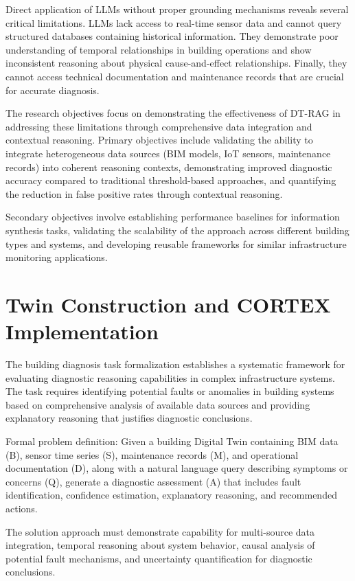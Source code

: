 Direct application of LLMs without proper grounding mechanisms reveals several critical limitations. LLMs lack access to real-time sensor data and cannot query structured databases containing historical information. They demonstrate poor understanding of temporal relationships in building operations and show inconsistent reasoning about physical cause-and-effect relationships. Finally, they cannot access technical documentation and maintenance records that are crucial for accurate diagnosis.

The research objectives focus on demonstrating the effectiveness of DT-RAG in addressing these limitations through comprehensive data integration and contextual reasoning. Primary objectives include validating the ability to integrate heterogeneous data sources (BIM models, IoT sensors, maintenance records) into coherent reasoning contexts, demonstrating improved diagnostic accuracy compared to traditional threshold-based approaches, and quantifying the reduction in false positive rates through contextual reasoning.

Secondary objectives involve establishing performance baselines for information synthesis tasks, validating the scalability of the approach across different building types and systems, and developing reusable frameworks for similar infrastructure monitoring applications.

\section{Twin Construction and CORTEX Implementation}

The building diagnosis task formalization establishes a systematic framework for evaluating diagnostic reasoning capabilities in complex infrastructure systems. The task requires identifying potential faults or anomalies in building systems based on comprehensive analysis of available data sources and providing explanatory reasoning that justifies diagnostic conclusions.

Formal problem definition: Given a building Digital Twin containing BIM data (B), sensor time series (S), maintenance records (M), and operational documentation (D), along with a natural language query describing symptoms or concerns (Q), generate a diagnostic assessment (A) that includes fault identification, confidence estimation, explanatory reasoning, and recommended actions.

The solution approach must demonstrate capability for multi-source data integration, temporal reasoning about system behavior, causal analysis of potential fault mechanisms, and uncertainty quantification for diagnostic conclusions.

